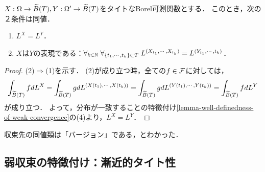 \documentclass[uplatex,dvipdfmx]{jsreport}
\begin{document}
\begin{lemma}[有限な周辺分布への注目]\label{lemma-equalness-of-distribution-in-terms-of-finite-marginal-distribution}
    $X:\Omega\to\widetilde{B}(T),Y:\Omega'\to\widetilde{B}(T)$をタイトなBorel可測関数とする．
    このとき，次の２条件は同値．
    \begin{enumerate}
        \item $L^X=L^Y$．
        \item $X$は$Y$の表現である：$\forall_{k\in\mathbb{N}}\;\forall_{\{t_1,\cdots,t_k\}\subset T}\;L^{(X_{t_1},\cdots,X_{t_k})}=L^{(Y_{t_1},\cdots,t_k)}$．
    \end{enumerate}
\end{lemma}
\begin{proof}
    (2)$\Rightarrow$(1)を示す．
    (2)が成り立つ時，全ての$f\in\mathcal{F}$に対しては，
    \[\int_{\widetilde{B}(T)}fdL^X=\int_{\widetilde{B}(T)}gdL^{(X(t_1),\cdots,X(t_k))}=\int_{\widetilde{B}(T)}gdL^{(Y(t_1),\cdots,Y(t_k))}=\int_{\widetilde{B}(T)}fdL^Y\]
    が成り立つ．
    よって，分布が一致することの特徴付け\ref{lemma-well-definedness-of-weak-convergence}の(4)より，$L^X=L^Y$．
\end{proof}
\begin{remarks}
    収束先の同値類は「バージョン」である，とわかった．
\end{remarks}

\subsection{弱収束の特徴付け：漸近的タイト性}
\end{document}
